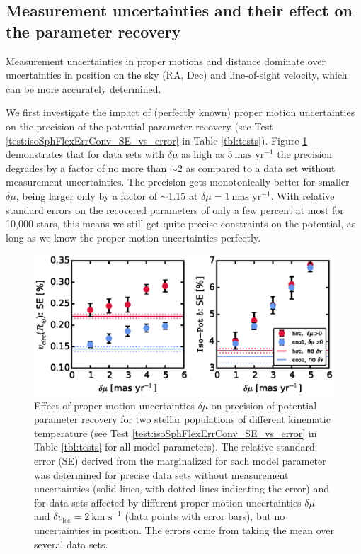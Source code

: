 \subsection{Measurement uncertainties and their effect on the parameter recovery} \label{sec:results_errors}

Measurement uncertainties in proper motions and distance dominate over uncertainties in position on the sky (RA, Dec) and line-of-sight velocity, which can be more accurately determined.

We first investigate the impact of (perfectly known) proper motion uncertainties on the precision of the potential parameter recovery (see Test \ref{test:isoSphFlexErrConv_SE_vs_error} in Table \ref{tbl:tests}). Figure \ref{fig:isoSphFlexErrConv_SE_vs_error} demonstrates that for data sets with $\delta \mu$ as high as $5~\text{mas yr}^{-1}$ the precision degrades by  a factor of no more than $\sim2$ as compared to a data set without measurement uncertainties. The precision gets monotonically better for smaller $\delta \mu$, being larger only by a factor of $\sim 1.15$ at $\delta \mu=1~\text{mas yr}^{-1}$. With relative standard errors on the recovered parameters of only a few percent at most for 10,000 stars, this means we still get quite precise constraints on the potential, as long as we know the proper motion uncertainties perfectly.


\begin{figure}[!htbp]
\centering
\includegraphics[width=\columnwidth]{figs/isoSphFlexErrConv_SE_vs_error.eps}
\caption{Effect of proper motion uncertainties $\delta \mu$ on precision of potential parameter recovery for two stellar populations of different kinematic temperature (see Test \ref{test:isoSphFlexErrConv_SE_vs_error} in Table \ref{tbl:tests} for all model parameters). The relative standard error (SE) derived from the marginalized \pdf{} for each model parameter was determined for precise data sets without measurement uncertainties (solid lines, with dotted lines indicating the error) and for data sets affected by different proper motion uncertainties $\delta \mu$ and $\delta v_\text{los}=2~\text{km s}^{-1}$ (data points with error bars), but no uncertainties in position. The errors come from taking the mean over several data sets.}
\label{fig:isoSphFlexErrConv_SE_vs_error}
\end{figure}


